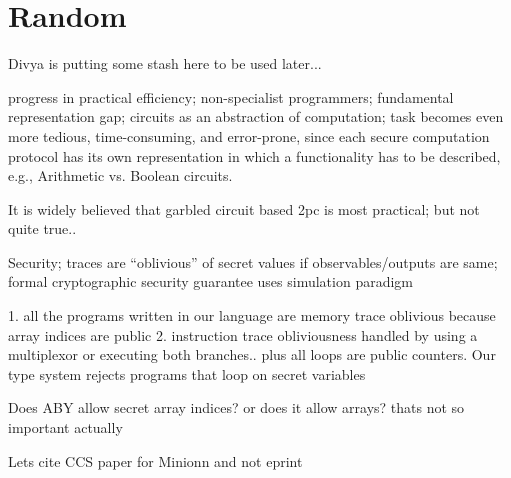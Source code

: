 \section{Random}

Divya is putting some stash here to be used later...

 progress in practical efficiency; non-specialist programmers; fundamental representation gap; circuits as an abstraction of computation; task becomes even more tedious, time-consuming, and error-prone,
since each secure computation protocol has its own
representation in which a functionality has to be described, e.g.,
Arithmetic vs. Boolean circuits.

 It is widely believed that garbled circuit based 2pc is most practical; but not quite true..

 Security; traces are ``oblivious'' of secret values if observables/outputs are same; formal cryptographic security guarantee uses simulation paradigm \cite{canetti2000} 


 1. all the programs written in our language are memory trace oblivious because array indices are public 2. instruction trace obliviousness handled by using a multiplexor or executing both branches.. plus all loops are public counters. Our type system rejects programs that loop on secret variables

 Does ABY allow secret array indices? or does it allow arrays? thats not so important actually


 Lets cite CCS paper for Minionn and not eprint



